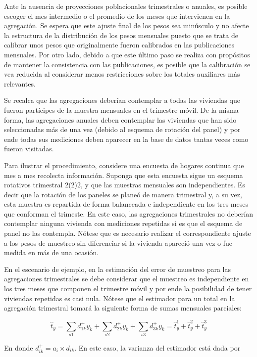 \documentclass[
  12pt,
  spanish,
]{book}
\begin{document}
Ante la ausencia de proyecciones poblacionales trimestrales o anuales, es posible escoger el mes intermedio o el
promedio de los meses que intervienen en la agregación. Se espera que este ajuste final de los pesos
sea minúsculo y no afecte la estructura de la distribución de los pesos
mensuales puesto que se trata de calibrar unos pesos que originalmente
fueron calibrados en las publicaciones mensuales. Por otro lado, debido
a que este último paso se realiza con propósitos de mantener la
consistencia con las publicaciones, es posible que la calibración se vea
reducida al considerar menos restricciones sobre los totales auxiliares
más relevantes.

Se recalca que las agregaciones deberían contemplar a todas las
viviendas que fueron partícipes de la muestra mensuales en el trimestre
móvil. De la misma forma, las agregaciones anuales deben contemplar las
viviendas que han sido seleccionadas más de una vez (debido al esquema
de rotación del panel) y por ende todas sus mediciones deben aparecer en
la base de datos tantas veces como fueron visitadas.

Para ilustrar el procedimiento, considere una encuesta de hogares continua que mes a mes recolecta información. Suponga que esta encuesta sigue un esquema rotativos trimestral 2(2)2, y que las muestras mensuales son independientes. Es decir que la rotación de los paneles se planeó de manera trimestral y, a su vez, esta muestra es repartida de forma balanceada e independiente en los tres meses que conforman el trimeste. En este caso, las agregaciones trimestrales no deberían
contemplar ninguna vivienda con mediciones repetidas si es que el
esquema de panel no las contempla. Nótese que es necesario realizar el
correspondiente ajuste a los pesos de muestreo sin diferenciar si la
vivienda apareció una vez o fue medida en más de una ocasión.

En el escenario de ejemplo, en la estimación del error de muestreo para
las agregaciones trimestrales se debe considerar que el muestreo es
independiente en los tres meses que componen el trimestre móvil y por
ende la posibilidad de tener viviendas repetidas es casi nula. Nótese
que el estimador para un total en la agregación trimestral tomará la
siguiente forma de sumas mensuales parciales:

\[
\hat{t}_y 
= \sum_{s1} d_{1k}^+ y_k + \sum_{s2} d_{2k}^+ y_k + \sum_{s3} d_{3k}^+ y_k
= \hat{t}_{y}^1 + \hat{t}_{y}^2 + \hat{t}_{y}^3
\]

En donde \(d_{ik}^+ = a_i \times d_{ik}\). En este caso, la varianza del estimador está dada por
\end{document}

